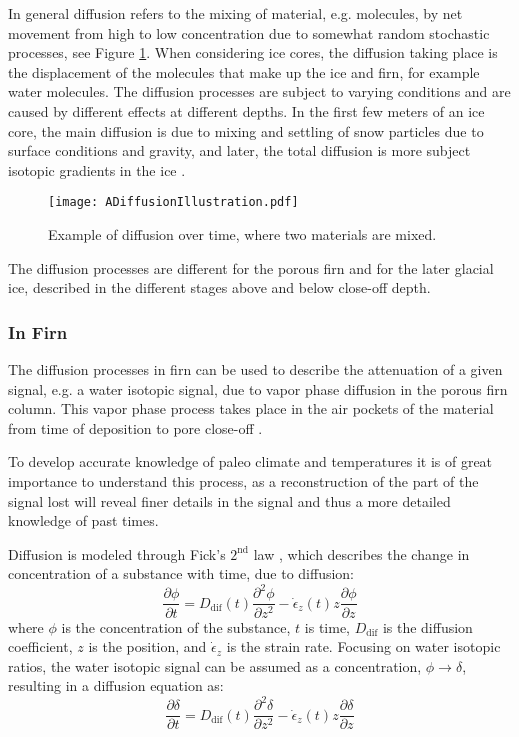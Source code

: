 \documentclass[../../CompleteThesis2/Complete_2ndDraft]{subfiles}
\begin{document}
In general diffusion refers to the mixing of material, e.g. molecules, by net movement from high to low concentration due to somewhat random stochastic processes, see Figure \ref{Fig:DiffusionIllustration}. When considering ice cores, the diffusion taking place is the displacement of the molecules that make up the ice and firn, for example water molecules. The diffusion processes are subject to varying conditions and are caused by different effects at different depths. In the first few meters of an ice core, the main diffusion is due to mixing and settling of snow particles due to surface conditions and gravity, and later, the total diffusion is more subject isotopic gradients in the ice \cite[S. Johnsen et al., 2000]{Johnsen2000a}. 
\begin{figure}
	\centering
	\texttt{[image: ADiffusionIllustration.pdf]}
	\caption[Diffusion]{\small Example of diffusion over time, where two materials are mixed.}
	\label{Fig:DiffusionIllustration}
\end{figure}

The diffusion processes are different for the porous firn and for the later glacial ice, described in the different stages above and below close-off depth.

\subsubsection{In Firn}
\label{Subsubsec:Ice_DiffusionAndDensification_Diffusion_Firn}
The diffusion processes in firn can be used to describe the attenuation of a given signal, e.g. a water isotopic signal, due to vapor phase diffusion in the porous firn column. This vapor phase process takes place in the air pockets of the material from time of deposition to pore close-off \cite{Johnsen2000a}. 

To develop accurate knowledge of paleo climate and temperatures it is of great importance to understand this process, as a reconstruction of the part of the signal lost will reveal finer details in the signal and thus a more detailed knowledge of past times. 

Diffusion is modeled through Fick's $2^{\text{nd}}$ law \cite[A. Fick, 1851]{Fick1851}, which describes the change in concentration of a substance with time, due to diffusion:
\begin{equation}
	\frac{\partial \phi}{\partial t} = D_{\text{dif}}(t) \frac{\partial^2 \phi}{\partial z^2} - \dot{\epsilon}_z(t) z \frac{\partial \phi}{\partial z}
	\label{Eq:Fick2_concentration}
\end{equation}
where $\phi$ is the concentration of the substance, $t$ is time, $D_{\text{dif}}$ is the diffusion coefficient, $z$ is the position, and $\dot{\epsilon}_z$ is the strain rate. Focusing on water isotopic ratios, the water isotopic signal can be assumed as a concentration, $\phi \rightarrow \delta$, resulting in a diffusion equation as:
\begin{equation}
	\frac{\partial \delta}{\partial t} = D_{\text{dif}}(t) \frac{\partial^2 \delta}{\partial z^2} - \dot{\epsilon}_z(t) z \frac{\partial \delta}{\partial z}
	\label{Eq:Fick2_WIS}
\end{equation}
\end{document}
